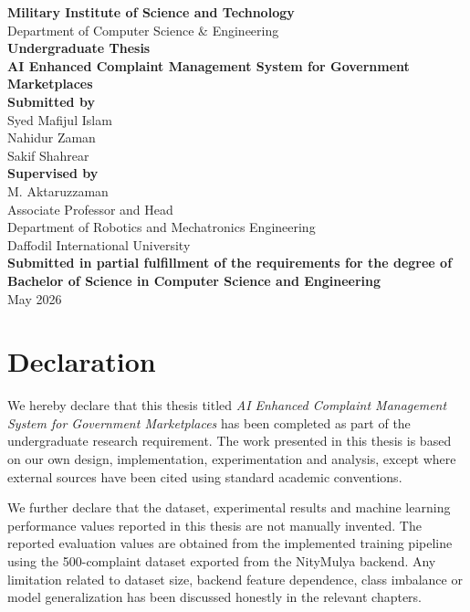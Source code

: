 \documentclass[12pt,a4paper,openany]{book}
\newcommand{\thesistitle}{AI Enhanced Complaint Management System for Government Marketplaces}
\newcommand{\studentone}{Syed Mafijul Islam}
\newcommand{\studenttwo}{Nahidur Zaman}
\newcommand{\studentthree}{Sakif Shahrear}
\newcommand{\supervisor}{M. Aktaruzzaman}
\newcommand{\department}{Department of Computer Science \& Engineering}
\newcommand{\institution}{Military Institute of Science and Technology}
\newcommand{\supervisordesignation}{Associate Professor and Head}
\newcommand{\supervisordepartment}{Department of Robotics and Mechatronics Engineering}
\newcommand{\supervisorinstitution}{Daffodil International University}
\newcommand{\submissiondate}{May 2026}
\begin{document}
\frontmatter

\begin{titlepage}
\begin{center}
{\Large \textbf{\institution}}\\[0.3cm]
{\large \department}\\[2.2cm]

{\Large \textbf{Undergraduate Thesis}}\\[0.6cm]
{\LARGE \textbf{\thesistitle}}\\[2.2cm]

\textbf{Submitted by}\\[0.3cm]
\studentone\\
\studenttwo\\
\studentthree\\[1.4cm]

\textbf{Supervised by}\\[0.3cm]
\supervisor\\
\supervisordesignation\\
\supervisordepartment\\
\supervisorinstitution\\[1.4cm]

\textbf{Submitted in partial fulfillment of the requirements for the degree of}\\[0.2cm]
\textbf{Bachelor of Science in Computer Science and Engineering}\\[1.3cm]

\submissiondate
\end{center}
\end{titlepage}

\chapter*{Declaration}
We hereby declare that this thesis titled \textit{\thesistitle} has been completed as part of the undergraduate research requirement. The work presented in this thesis is based on our own design, implementation, experimentation and analysis, except where external sources have been cited using standard academic conventions.

We further declare that the dataset, experimental results and machine learning performance values reported in this thesis are not manually invented. The reported evaluation values are obtained from the implemented training pipeline using the 500-complaint dataset exported from the NityMulya backend. Any limitation related to dataset size, backend feature dependence, class imbalance or model generalization has been discussed honestly in the relevant chapters.
\end{document}
